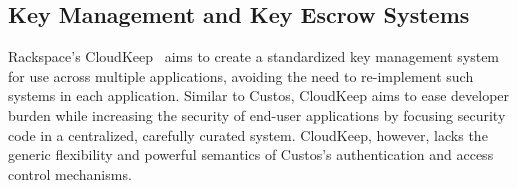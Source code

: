 \subsection{Key Management and Key Escrow Systems}
\cite{Blaze1996, Denning1996}
\cite{cloudkeep-presentation, cloudkeep}
\cite{gazzang, porticor, Rosen2012}
\cite{amazon-hsm}

Rackspace's CloudKeep~\cite{cloudkeep} aims to create a standardized
key management system for use across multiple applications, avoiding
the need to re-implement such systems in each application. Similar to
Custos, CloudKeep aims to ease developer burden while increasing the
security of end-user applications by focusing security code in a
centralized, carefully curated system. CloudKeep, however, lacks the
generic flexibility and powerful semantics of Custos's authentication
and access control mechanisms.

